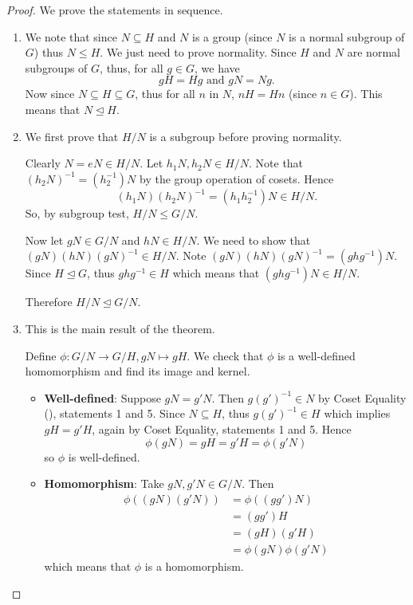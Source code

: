 \begin{proof}
    We prove the statements in sequence.

    \begin{enumerate}
        \item We note that since $N \subseteq H$ and $N$ is a group (since $N$ is a normal subgroup of $G$) thus $N \leq H$. We just need to prove normality. Since $H$ and $N$ are normal subgroups of $G$, thus, for all $g \in G$, we have
        \[
            gH = Hg \text{ and } gN = Ng.
        \]
        Now since $N \subseteq H \subseteq G$, thus for all $n$ in $N$, $nH = Hn$ (since $n \in G$). This means that $N \unlhd H$.

        \item We first prove that $H/N$ is a subgroup before proving normality.

        Clearly $N = eN \in H/N$. Let $h_1N, h_2N \in H/N$. Note that $(h_2N)^{-1} = \left(h_2^{-1}\right)N$ by the group operation of cosets. Hence
        \[
            (h_1N)(h_2N)^{-1} = (h_1h_2^{-1})N \in H/N.
        \]
        So, by subgroup test, $H/N \leq G/N$.

        Now let $gN \in G/N$ and $hN \in H/N$. We need to show that $(gN)(hN)(gN)^{-1} \in H/N$. Note $(gN)(hN)(gN)^{-1} = (ghg^{-1})N$. Since $H \unlhd G$, thus $ghg^{-1} \in H$ which means that $(ghg^{-1})N \in H/N$.

        Therefore $H/N \unlhd G/N$.

        \item This is the main result of the theorem.

        Define $\phi: G/N \to G/H, gN \mapsto gH$. We check that $\phi$ is a well-defined homomorphism and find its image and kernel.
        \begin{itemize}
            \item \textbf{Well-defined}: Suppose $gN = g'N$. Then $g(g')^{-1} \in N$ by Coset Equality (), statements 1 and 5. Since $N \subseteq H$, thus $g(g')^{-1} \in H$ which implies $gH = g'H$, again by Coset Equality, statements 1 and 5. Hence
            \[
                \phi(gN) = gH = g'H = \phi(g'N)
            \]
            so $\phi$ is well-defined.

            \item \textbf{Homomorphism}: Take $gN, g'N \in G/N$. Then
            \begin{align*}
                \phi((gN)(g'N)) &= \phi((gg')N)\\
                &= (gg')H\\
                &= (gH)(g'H)\\
                &= \phi(gN)\phi(g'N)
            \end{align*}
            which means that $\phi$ is a homomorphism.


\end{itemize}
\end{enumerate}
\end{proof}
